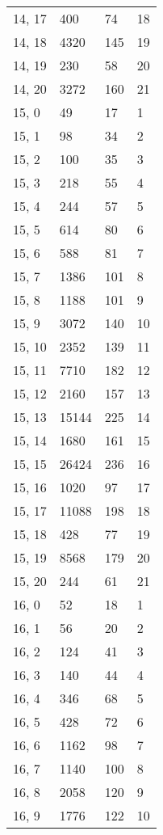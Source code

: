 \begin{table}
\begin{tabular}{llll}
14, 17 &     400 &   74 &    18 \\
14, 18 &    4320 &  145 &    19 \\
14, 19 &     230 &   58 &    20 \\
14, 20 &    3272 &  160 &    21 \\
15, 0  &      49 &   17 &     1 \\
15, 1  &      98 &   34 &     2 \\
15, 2  &     100 &   35 &     3 \\
15, 3  &     218 &   55 &     4 \\
15, 4  &     244 &   57 &     5 \\
15, 5  &     614 &   80 &     6 \\
15, 6  &     588 &   81 &     7 \\
15, 7  &    1386 &  101 &     8 \\
15, 8  &    1188 &  101 &     9 \\
15, 9  &    3072 &  140 &    10 \\
15, 10 &    2352 &  139 &    11 \\
15, 11 &    7710 &  182 &    12 \\
15, 12 &    2160 &  157 &    13 \\
15, 13 &   15144 &  225 &    14 \\
15, 14 &    1680 &  161 &    15 \\
15, 15 &   26424 &  236 &    16 \\
15, 16 &    1020 &   97 &    17 \\
15, 17 &   11088 &  198 &    18 \\
15, 18 &     428 &   77 &    19 \\
15, 19 &    8568 &  179 &    20 \\
15, 20 &     244 &   61 &    21 \\
16, 0  &      52 &   18 &     1 \\
16, 1  &      56 &   20 &     2 \\
16, 2  &     124 &   41 &     3 \\
16, 3  &     140 &   44 &     4 \\
16, 4  &     346 &   68 &     5 \\
16, 5  &     428 &   72 &     6 \\
16, 6  &    1162 &   98 &     7 \\
16, 7  &    1140 &  100 &     8 \\
16, 8  &    2058 &  120 &     9 \\
16, 9  &    1776 &  122 &    10 \\

\end{tabular}
\end{table}

